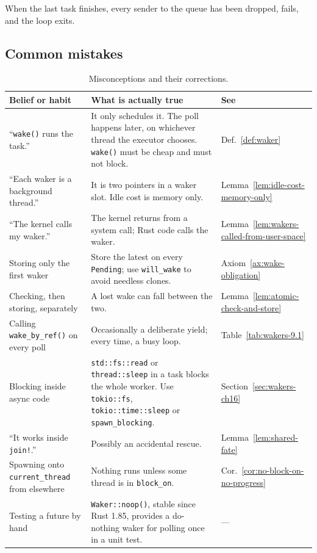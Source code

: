 When the last task finishes, every sender to the queue has been dropped,  fails, and the loop exits.

\subsection{Common mistakes}
\label{sec:wakers-ch18}

\begin{table}[htbp]
    \centering\small
    \begin{tabularx}{\linewidth}{>{\raggedright\arraybackslash}p{4.2cm} Y >{\raggedright\arraybackslash}p{1.8cm}}
        \toprule
        \textbf{Belief or habit} & \textbf{What is actually true} & \textbf{See} \\
        \midrule
        ``\texttt{wake()} runs the task.'' & It only schedules it. The poll happens later, on whichever thread the executor chooses. \texttt{wake()} must be cheap and must not block. & Def.~\ref{def:waker} \\
        ``Each waker is a background thread.'' & It is two pointers in a waker slot. Idle cost is memory only. & Lemma~\ref{lem:idle-cost-memory-only} \\
        ``The kernel calls my waker.'' & The kernel returns from a system call; Rust code calls the waker. & Lemma~\ref{lem:wakers-called-from-user-space} \\
        Storing only the first waker & Store the latest on every \texttt{Pending}; use \texttt{will\_wake} to avoid needless clones. & Axiom~\ref{ax:wake-obligation} \\
        Checking, then storing, separately & A lost wake can fall between the two. & Lemma~\ref{lem:atomic-check-and-store} \\
        Calling \texttt{wake\_by\_ref()} on every poll & Occasionally a deliberate yield; every time, a busy loop. & Table~\ref{tab:wakers-9.1} \\
        Blocking inside async code & \texttt{std::fs::read} or \texttt{thread::sleep} in a task blocks the whole worker. Use \texttt{tokio::fs}, \texttt{tokio::time::sleep} or \texttt{spawn\_blocking}. & Section~\ref{sec:wakers-ch16} \\
        ``It works inside \texttt{join!}.'' & Possibly an accidental rescue. & Lemma~\ref{lem:shared-fate} \\
        Spawning onto \texttt{current\_thread} from elsewhere & Nothing runs unless some thread is in \texttt{block\_on}. & Cor.~\ref{cor:no-block-on-no-progress} \\
        Testing a future by hand & \texttt{Waker::noop()}, stable since Rust 1.85, provides a do-nothing waker for polling once in a unit test. & --- \\
        \bottomrule
    \end{tabularx}
    \caption{Misconceptions and their corrections.}
    \label{tab:wakers-18.1}
\end{table}

